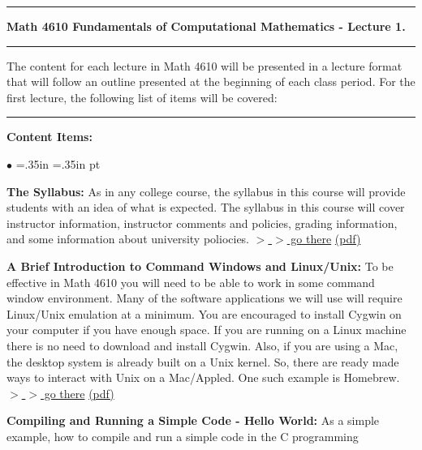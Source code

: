 \documentclass[10pt,fleqn]{article}
\begin{document}
\vskip0.1in\hrule\vskip0.1in
\noindent
{\bf Math 4610 Fundamentals of Computational Mathematics  - Lecture 1.} 
\vskip0.1in\hrule\vskip0.1in
\noindent
The content for each lecture in Math 4610 will be presented in a lecture format
that will follow an outline presented at the beginning of each class period.
For the first lecture, the following list of items will be covered:
\vskip0.1in\hrule\vskip0.1in
\noindent
{\bf Content Items:}
\begin{list}{$\bullet$}{ \parsep=0pt \listparindent=0pt
\topsep=0pt \rightmargin=.35in \leftmargin=.35in  pt
\itemsep=2pt}
  \item {\bf The Syllabus:} As in any college course, the syllabus in this
        course will provide students with an idea of what is expected. The
        syllabus in this course will cover instructor information, instructor
        comments and policies, grading information, and some information about
        university poliocies.
        \href{https://jvkoebbe.github.io/math4610/syllabus/md/syllabus}{$>$ $>$ go there}
        \href{https://jvkoebbe.github.io/math4610/syllabus/pdf/syllabus}{(pdf)}
  \item {\bf A Brief Introduction to Command Windows and Linux/Unix:} To be
        effective in Math 4610 you will need to be able to work in some command
        window environment. Many of the software applications we will use will
        require Linux/Unix emulation at a minimum. You are encouraged to install
        Cygwin on your computer if you have enough space. If you are running
        on a Linux machine there is no need to download and install Cygwin.
        Also, if you are using a Mac, the desktop system is already built on a
        Unix kernel. So, there are ready made ways to interact with Unix on a
        Mac/Appled. One such example is Homebrew.
        \href{https://jvkoebbe.github.io/math4610/lectures/lecture_01/md/cygwin_primer}{$>$ $>$ go there}
        \href{https://jvkoebbe.github.io/math4610/lectures/lecture_01/pdf/cygwin_primer.pdf}{(pdf)}
  \item {\bf Compiling and Running a Simple Code - Hello World:} As a simple
        example, how to compile and run a simple code in the C programming

\end{list}
\end{document}
